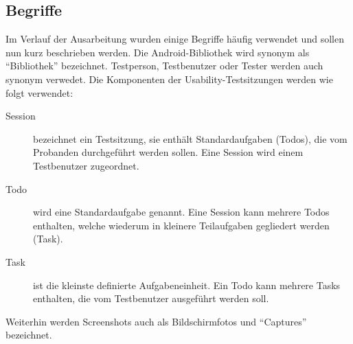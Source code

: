 \subsection{Begriffe}
Im Verlauf der Ausarbeitung wurden einige Begriffe häufig verwendet und sollen nun kurz beschrieben werden.
Die Android-Bibliothek wird synonym als \enquote{Bibliothek} bezeichnet.
Testperson, Testbenutzer oder Tester werden auch synonym verwedet.
Die Komponenten der Usability-Testsitzungen werden wie folgt verwendet:
\begin{description}
	\item[Session] bezeichnet ein Testsitzung, sie enthält Standardaufgaben (Todos), die vom Probanden durchgeführt werden sollen. Eine Session wird einem Testbenutzer zugeordnet.
	\item[Todo] wird eine Standardaufgabe genannt. Eine Session kann mehrere Todos enthalten, welche wiederum in kleinere Teilaufgaben gegliedert werden (Task).
	\item[Task] ist die kleinste definierte Aufgabeneinheit. Ein Todo kann mehrere Tasks enthalten, die vom Testbenutzer ausgeführt werden soll.
\end{description}
Weiterhin werden Screenshots auch als Bildschirmfotos und \enquote{Captures} bezeichnet. 
